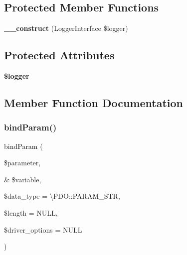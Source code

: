 \subsection*{Protected Member Functions}
\begin{DoxyCompactItemize}
\item 
\mbox{\label{class_pes_1_1_database_1_1_statement_1_1_statement_a2bd426f7ee55a596b1893454a77a006a}} 
{\bfseries \+\_\+\+\_\+construct} (Logger\+Interface \$logger)
\end{DoxyCompactItemize}
\subsection*{Protected Attributes}
\begin{DoxyCompactItemize}
\item 
\mbox{\label{class_pes_1_1_database_1_1_statement_1_1_statement_aebfec76216371ef236acc5910e90933d}} 
{\bfseries \$logger}
\end{DoxyCompactItemize}


\subsection{Member Function Documentation}
\mbox{\label{class_pes_1_1_database_1_1_statement_1_1_statement_a5b8b69a18923922832bcd98438c28908}} 
\subsubsection{\texorpdfstring{bind\+Param()}{bindParam()}}
{\footnotesize\ttfamily bind\+Param (\begin{DoxyParamCaption}\item[{}]{\$parameter,  }\item[{\&}]{\$variable,  }\item[{}]{\$data\+\_\+type = {\ttfamily \textbackslash{}PDO\+:\+:PARAM\+\_\+STR},  }\item[{}]{\$length = {\ttfamily NULL},  }\item[{}]{\$driver\+\_\+options = {\ttfamily NULL} }\end{DoxyParamCaption})}

